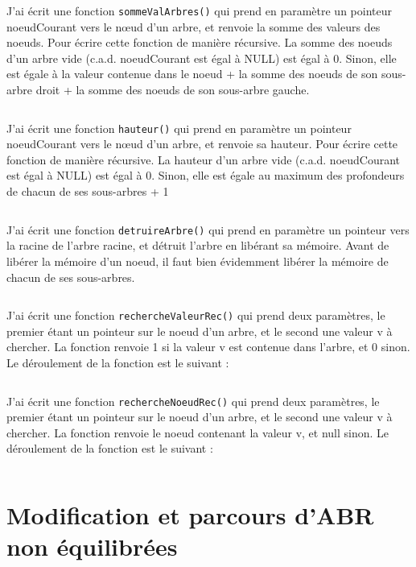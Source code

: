 J'ai écrit une fonction \texttt{sommeValArbres()} qui prend en paramètre un pointeur noeudCourant vers le nœud d’un arbre, et renvoie la somme des valeurs des noeuds. Pour écrire cette fonction de manière récursive. La somme des noeuds d’un arbre vide (c.a.d. noeudCourant est égal à NULL) est égal à 0. Sinon, elle est égale à la valeur contenue dans le noeud + la somme des noeuds de son sous-arbre droit + la somme des noeuds de son sous-arbre gauche.
\inputminted[linenos,firstline=18,lastline=22]{cpp}{../sources/cpp/TP3-4/arbresFctRecursives.c}

J'ai écrit une fonction \texttt{hauteur()} qui prend en paramètre un pointeur noeudCourant vers le nœud d’un arbre, et renvoie sa hauteur. Pour écrire cette fonction de manière récursive. La hauteur d’un arbre vide (c.a.d. noeudCourant est égal à NULL) est égal à 0. Sinon, elle est égale au maximum des profondeurs de chacun de ses sous-arbres + 1
\inputminted[linenos,firstline=24,lastline=28]{cpp}{../sources/cpp/TP3-4/arbresFctRecursives.c}

J'ai écrit une fonction \texttt{detruireArbre()} qui prend en paramètre un pointeur vers la racine de l’arbre racine, et détruit l’arbre en libérant sa mémoire. Avant de libérer la mémoire d’un noeud, il faut bien évidemment libérer la mémoire de chacun de ses sous-arbres.
\inputminted[linenos,firstline=30,lastline=36]{cpp}{../sources/cpp/TP3-4/arbresFctRecursives.c}

J'ai écrit une fonction \texttt{rechercheValeurRec()} qui prend deux paramètres, le premier étant un pointeur sur le noeud d'un arbre, et le second une valeur v à chercher. La fonction renvoie 1 si la valeur v est contenue dans l’arbre, et 0 sinon. Le déroulement de la fonction est le suivant :
\inputminted[linenos,firstline=38,lastline=42]{cpp}{../sources/cpp/TP3-4/arbresFctRecursives.c}

J'ai écrit une fonction \texttt{rechercheNoeudRec()} qui prend deux paramètres, le premier étant un pointeur sur  le noeud d'un arbre, et le second une valeur v à chercher. La fonction renvoie le noeud contenant la valeur v, et null sinon. Le déroulement de la fonction est le suivant :
\inputminted[linenos,firstline=44,lastline=50]{cpp}{../sources/cpp/TP3-4/arbresFctRecursives.c}

\section{Modification et parcours d’ABR non équilibrées}

